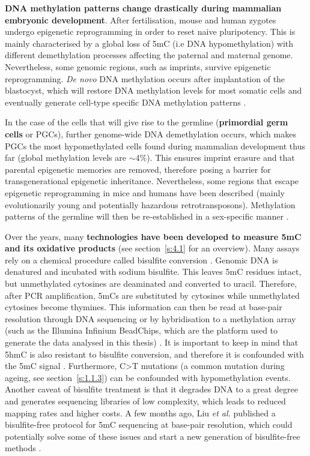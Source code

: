 \bigskip

\textbf{DNA methylation patterns change drastically during mammalian embryonic development}. After fertilisation, mouse and human zygotes undergo epigenetic reprogramming in order to reset naive pluripotency. This is mainly characterised by a global loss of 5mC (i.e DNA hypomethylation) with different demethylation processes affecting the paternal and maternal genome. Nevertheless, some genomic regions, such as imprints, survive epigenetic reprogramming. \textit{De novo} DNA methylation occurs after implantation of the blastocyst, which will restore DNA methylation levels for most somatic cells and eventually generate cell-type specific DNA methylation patterns \citep{Iurlaro2017,Tang2016,Atlasi2017}. 

\bigskip

In the case of the cells that will give rise to the germline (\textbf{primordial germ cells} or \acrshort{PGCs}), further genome-wide DNA demethylation occurs, which makes \acrshort{PGCs} the most hypomethylated cells found during mammalian development thus far (global methylation levels are $\sim$4\%). This ensures imprint erasure and that parental epigenetic memories are removed, therefore posing a barrier for transgenerational epigenetic inheritance. Nevertheless, some regions that escape epigenetic reprogramming in mice and humans have been described (mainly evolutionarily young and potentially hazardous retrotransposons). Methylation patterns of the germline will then be re-established in a sex-specific manner \citep{Tang2016}.  

\bigskip

Over the years, many \textbf{technologies have been developed to measure 5mC and its oxidative products} (see section~\ref{s:4.1} for an overview). Many assays rely on a chemical procedure called bisulfite conversion \citep{Frommer1992}. Genomic DNA is denatured and incubated with sodium bisulfite. This leaves 5mC residues intact, but unmethylated cytosines are deaminated and converted to uracil. Therefore, after PCR amplification, 5mCs are substituted by cytosines while unmethylated cytosines become thymines. This information can then be read at base-pair resolution through DNA sequencing or by hybridisation to a methylation array (such as the Illumina Infinium BeadChips, which are the platform used to generate the data analysed in this thesis) \citep{Plongthongkum2014}. It is important to keep in mind that 5hmC is also resistant to bisulfite conversion, and therefore it is confounded with the 5mC signal \citep{Wu2017}. Furthermore, C>T mutations (a common mutation during ageing, see section~\ref{s:1.1.3}) can be confounded with hypomethylation events. Another caveat of bisulfite treatment is that it degrades DNA to a great degree and generates sequencing libraries of low complexity, which leads to reduced mapping rates and higher costs. A few months ago, Liu \textit{et al.} published a bisulfite-free protocol for 5mC sequencing at base-pair resolution, which could potentially solve some of these issues and start a new generation of bisulfite-free methods \citep{Liu2019}. 

